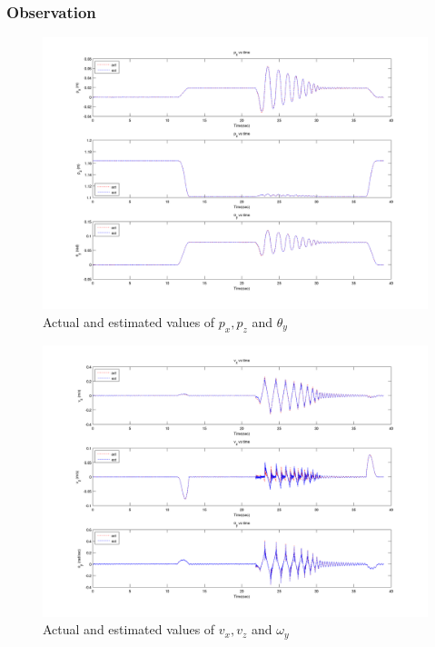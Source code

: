 \subsubsection{Observation}
\begin{figure}
    \centering
    \includegraphics[trim=25mm 10mm 25mm 10mm,clip,scale=0.6]{Bilder/plots/toro/toro_pos.png}
    \caption{Actual and estimated values of $p_x,p_z$ and $\theta_y$}
    \label{fig:toro_plotpos}
\end{figure}
\begin{figure}
    \centering
    \includegraphics[trim=25mm 10mm 25mm 10mm,clip,scale=0.55]{Bilder/plots/toro/toro_vel.png}
    \caption{Actual and estimated values of $v_x,v_z$ and $\omega_y$}
    \label{fig:toro_plotvel}
\end{figure}


